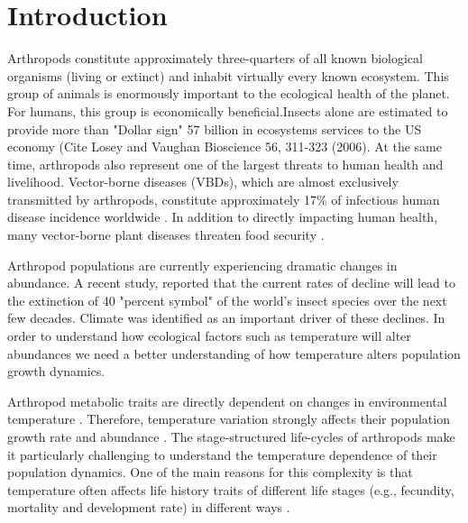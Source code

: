 
\section*{Introduction}
Arthropods constitute approximately three-quarters of all known biological organisms (living or extinct) and inhabit virtually every known ecosystem. This group of animals is enormously important to the ecological health of the planet. For humans, this group is economically beneficial.Insects alone are estimated to provide more than  "Dollar sign" 57 billion in ecosystems services to the US economy (Cite Losey and Vaughan Bioscience 56, 311-323 (2006). At the same time, arthropods also represent one of the largest threats to human health and livelihood. Vector-borne diseases (VBDs), which are almost exclusively transmitted by arthropods, constitute approximately 17\% of infectious human disease incidence worldwide \citep{WHO2004}. In addition to directly impacting human health, many vector-borne plant diseases threaten food security \citep{Nault1997, Childers2003, Kitajima2003, Rodrigues2003}. 

Arthropod populations are currently experiencing dramatic changes in abundance. A recent study, reported that the current rates of decline will lead to the extinction of 40 "percent symbol" of the world's insect species over the next few decades. Climate was identified as an important driver of these declines. In order to understand how ecological factors such as temperature will alter abundances we need a better understanding of how temperature alters population growth dynamics. 

Arthropod metabolic traits are directly dependent on changes in environmental temperature \citep{Tabachnick2010,Amarasekare2012a}. Therefore, temperature variation strongly affects their population growth rate and abundance \citep{Amarasekare2012a,Angilletta2009}. The stage-structured life-cycles of arthropods make it particularly challenging to understand the temperature dependence of their population dynamics. One of the main reasons for this complexity is that temperature often affects life history traits of different life stages (e.g., fecundity, mortality and development rate) in different ways \citep{Amarasekare2013,Mordecai2012,Dell2011a,Parham2010,Lunde2013}. 

